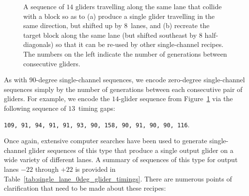 \begin{figure}[!htb]
	\centering
	\caption{A sequence of $14$ gliders travelling along the same lane that collide with a block so as to (a) produce a single glider travelling in the same direction, but shifted up by $8$~lanes, and (b) recreate the target block along the same lane (but shifted southeast by 8 half-diagonals) so that it can be re-used by other single-channel recipes. The numbers on the left indicate the number of generations between consecutive gliders.}\label{fig:lane_8_0degree}
\end{figure}

As with $90$-degree single-channel sequences, we encode zero-degree single-channel sequences simply by the number of generations between each consecutive pair of gliders. For example, we encode the $14$-glider sequence from Figure~\ref{fig:lane_8_0degree} via the following sequence of $13$~timing gaps:
\begin{center}
	\texttt{109, 91, 94, 91, 91, 93, 90, 158, 90, 91, 90, 90, 116}.
\end{center}

Once again, extensive computer searches have been used to generate single-channel glider sequences of this type that produce a single output glider on a wide variety of different lanes. A summary of sequences of this type for output lanes $-22$ through $+22$ is provided in Table~\ref{tab:single_lane_0deg_glider_timings}. There are numerous points of clarification that need to be made about these recipes:\smallskip

